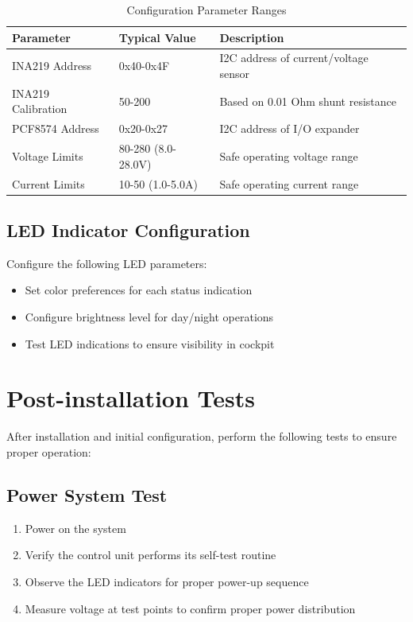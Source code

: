 \documentclass[12pt,a4paper,twoside,openright]{book}
\newcommand{\tabletextfont}{\normalfont\rmfamily}
\newcommand{\tableheadfont}{\normalfont\bfseries}
\begin{document}
\begin{table}[h]
\centering
\setlength{\tabcolsep}{5pt} %
\begin{tabular}{|p{}|p{}|p{}|}
\hline
\tableheadfont\textbf{Parameter} & \tableheadfont\textbf{Typical Value} & \tableheadfont\textbf{Description} \\
\hline
\tabletextfont INA219 Address & 0x40-0x4F & I2C address of current/voltage sensor \\
\hline
\tabletextfont INA219 Calibration & 50-200 & Based on 0.01 Ohm shunt resistance \\
\hline
\tabletextfont PCF8574 Address & 0x20-0x27 & I2C address of I/O expander \\
\hline
\tabletextfont Voltage Limits & 80-280 (8.0-28.0V) & Safe operating voltage range \\
\hline
\tabletextfont Current Limits & 10-50 (1.0-5.0A) & Safe operating current range \\
\hline
\end{tabular}
\caption{Configuration Parameter Ranges}
\end{table}

\subsection{LED Indicator Configuration}

Configure the following LED parameters:
\begin{itemize}
    \item Set color preferences for each status indication
    \item Configure brightness level for day/night operations
    \item Test LED indications to ensure visibility in cockpit
\end{itemize}

\section{Post-installation Tests}

After installation and initial configuration, perform the following tests to ensure proper operation:

\subsection{Power System Test}
\begin{enumerate}
    \item Power on the system
    \item Verify the control unit performs its self-test routine
    \item Observe the LED indicators for proper power-up sequence
    \item Measure voltage at test points to confirm proper power distribution
\end{enumerate}
\end{document}
